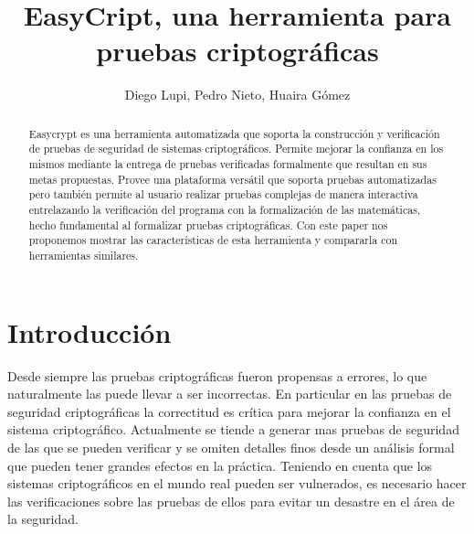 \documentclass[runningheads]{llncs}
\begin{document}
\title{EasyCript, una herramienta para pruebas criptográficas}

\author{Diego Lupi, Pedro Nieto, Huaira Gómez}


%
%

\maketitle

\begin{abstract}
Easycrypt\cite{ref_article1} es una herramienta automatizada que soporta la construcción y verificación de pruebas de seguridad de sistemas criptográficos. Permite mejorar la confianza en los mismos mediante la entrega de pruebas verificadas formalmente que resultan en sus metas propuestas. Provee una plataforma versátil que soporta pruebas automatizadas pero también permite al usuario realizar pruebas complejas de manera interactiva entrelazando la verificación del programa con la formalización de las matemáticas, hecho fundamental al formalizar pruebas criptográficas. Con este paper nos proponemos mostrar las características de esta herramienta y compararla con herramientas similares.

\end{abstract}
%
%
%
\section{Introducción}
Desde siempre las pruebas criptográficas fueron propensas a errores, lo que naturalmente las puede llevar a ser incorrectas.
 En particular en las pruebas de seguridad criptográficas la correctitud es crítica para mejorar la confianza en el sistema criptográfico. Actualmente se tiende a generar mas pruebas de seguridad de las que se pueden verificar y se omiten detalles finos desde un análisis formal que pueden tener grandes efectos en la práctica. Teniendo en cuenta que los sistemas criptográficos en el mundo real pueden ser vulnerados, es necesario hacer las verificaciones sobre las pruebas de ellos para evitar un desastre en el área de la seguridad.
\end{document}
